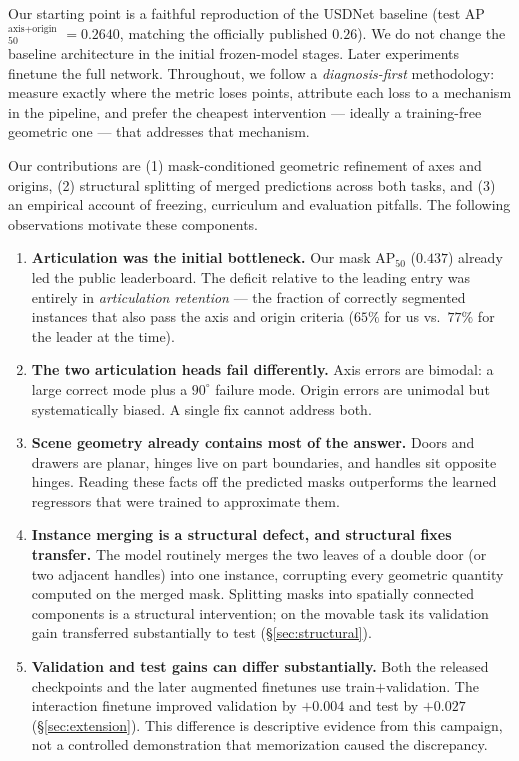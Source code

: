 \documentclass[11pt]{article}
\newcommand{\metric}{AP$_{50}^{\text{axis+origin}}$}
\newcommand{\apfifty}{AP$_{50}$}
\begin{document}
Our starting point is a faithful reproduction of the USDNet baseline
(test \metric{} $=0.2640$, matching the officially published $0.26$). We do
not change the baseline architecture in the initial frozen-model stages.
Later experiments finetune the full network. Throughout, we follow a
\emph{diagnosis-first} methodology: measure exactly where the metric loses
points, attribute each loss to a mechanism in the pipeline, and prefer the
cheapest intervention --- ideally a training-free geometric one --- that
addresses that mechanism.

Our contributions are (1) mask-conditioned geometric refinement of axes and
origins, (2) structural splitting of merged predictions across both tasks,
and (3) an empirical account of freezing, curriculum and evaluation pitfalls.
The following observations motivate these components.

\begin{enumerate}
\item \textbf{Articulation was the initial bottleneck.} Our mask \apfifty{}
  ($0.437$) already led the public leaderboard. The deficit relative to the
  leading entry was entirely in \emph{articulation retention} --- the fraction
  of correctly segmented instances that also pass the axis and origin
  criteria ($65\%$ for us vs.\ $77\%$ for the leader at the time).
\item \textbf{The two articulation heads fail differently.} Axis errors are
  bimodal: a large correct mode plus a $90^\circ$ failure mode. Origin errors
  are unimodal but systematically biased. A single fix cannot address both.
\item \textbf{Scene geometry already contains most of the answer.} Doors and
  drawers are planar, hinges live on part boundaries, and handles sit
  opposite hinges. Reading these facts off the predicted masks outperforms
  the learned regressors that were trained to approximate them.
\item \textbf{Instance merging is a structural defect, and structural fixes
  transfer.} The model routinely merges the two leaves of a double door (or
  two adjacent handles) into one instance, corrupting every geometric
  quantity computed on the merged mask.
  Splitting masks into spatially connected components is
  a structural intervention; on the movable task its validation gain
  transferred substantially to test (\S\ref{sec:structural}).
\item \textbf{Validation and test gains can differ substantially.} Both the
  released checkpoints and the later augmented finetunes use
  train$+$validation. The interaction finetune improved validation by
  $+0.004$ and test by $+0.027$ (\S\ref{sec:extension}). This difference is
  descriptive evidence from this campaign, not a controlled demonstration
  that memorization caused the discrepancy.
\end{enumerate}
\end{document}
